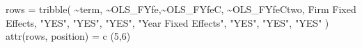 \documentclass[
  letterpaper,
  DIV=11,
  numbers=noendperiod]{scrreprt}
\newenvironment{Shaded}{\begin{snugshade}}{\end{snugshade}}
\newcommand{\DecValTok}[1]{\textcolor[rgb]{0.68,0.00,0.00}{#1}}
\newcommand{\FunctionTok}[1]{\textcolor[rgb]{0.28,0.35,0.67}{#1}}
\newcommand{\NormalTok}[1]{\textcolor[rgb]{0.00,0.23,0.31}{#1}}
\newcommand{\OtherTok}[1]{\textcolor[rgb]{0.00,0.23,0.31}{#1}}
\newcommand{\SpecialCharTok}[1]{\textcolor[rgb]{0.37,0.37,0.37}{#1}}
\newcommand{\StringTok}[1]{\textcolor[rgb]{0.13,0.47,0.30}{#1}}
\begin{document}
\begin{Shaded}
\begin{Highlighting}[]
\NormalTok{rows }\OtherTok{=} \FunctionTok{tribble}\NormalTok{(}
    \SpecialCharTok{\textasciitilde{}}\NormalTok{term, }\SpecialCharTok{\textasciitilde{}}\StringTok{\textquotesingle{}OLS\_FYfe\textquotesingle{}}\NormalTok{,}\SpecialCharTok{\textasciitilde{}}\StringTok{\textquotesingle{}OLS\_FYfeC\textquotesingle{}}\NormalTok{, }\SpecialCharTok{\textasciitilde{}}\StringTok{\textquotesingle{}OLS\_FYfeCtwo\textquotesingle{}}\NormalTok{,}
    \StringTok{\textquotesingle{}Firm Fixed Effects\textquotesingle{}}\NormalTok{, }\StringTok{"YES"}\NormalTok{, }\StringTok{"YES"}\NormalTok{, }\StringTok{"YES"}\NormalTok{,}
    \StringTok{"Year Fixed Effects"}\NormalTok{, }\StringTok{"YES"}\NormalTok{, }\StringTok{"YES"}\NormalTok{, }\StringTok{"YES"}
\NormalTok{)}
\FunctionTok{attr}\NormalTok{(rows, }\StringTok{\textquotesingle{}position\textquotesingle{}}\NormalTok{) }\OtherTok{=} \FunctionTok{c}\NormalTok{ (}\DecValTok{5}\NormalTok{,}\DecValTok{6}\NormalTok{)}




\end{Highlighting}
\end{Shaded}
\end{document}
